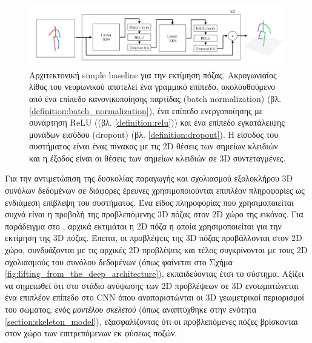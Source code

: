 \begin{figure}[h]
    \centering
    \includegraphics[scale=0.5]{images/chapter2/3d_pose_estimation/simple_baseline_architecture.jpg}
    \caption[Αρχιτεκτονική simple baseline για την εκτίμηση πόζας]{Αρχιτεκτονική simple baseline για την εκτίμηση πόζας. Ακρογωνιαίος λίθος του νευρωνικού αποτελεί ένα γραμμικό επίπεδο, ακολουθούμενο από ένα επίπεδο κανονικοποίησης παρτίδας (batch normalization) (βλ. \ref{definition:batch_normalization}), ένα επίπεδο ενεργοποίησης με συνάρτηση ReLU ((βλ. \ref{definition:relu})) και ένα επίπεδο εγκατάλειψης μονάδων εισόδου (dropout) (βλ. \ref{definition:dropout}). Η είσοδος του συστήματος είναι ένας πίνακας με τις 2D θέσεις των σημείων κλειδιών και η έξοδος είναι οι θέσεις των σημείων κλειδιών σε 3D συντεταγμένες.}
    \label{fig:simple_baseline}
\end{figure}

Για την αντιμετώπιση της δυσκολίας παραγωγής και σχολιασμού εξολοκλήρου 3D συνόλων δεδομένων σε διάφορες έρευνες χρησιμοποιούνται επιπλέον πληροφορίες ως ενδιάμεση επίβλεψη του συστήματος. Ένα είδος πληροφορίας που χρησιμοποιείται συχνά είναι η προβολή της προβλεπόμενης 3D πόζας στον 2D χώρο της εικόνας. Για παράδειγμα στο \cite{lifting_from_the_deep}, αρχικά εκτιμάται η 2D πόζα η οποία χρησιμοποιείται για την εκτίμηση της 3D πόζας. Έπειτα, οι προβλέψεις της 3D πόζας προβάλλονται στον 2D χώρο, συνδυάζονται με τις αρχικές 2D προβλέψεις και τέλος συγκρίνονται με τους 2D σχολιασμούς του συνόλου δεδομένων (όπως φαίνεται στο Σχήμα \ref{fig:lifting_from_the_deep_architecture}), εκπαιδεύοντας έτσι το σύστημα. Αξίζει να σημειωθεί ότι στο στάδιο ανύψωσης των 2D προβλέψεων σε 3D ενσωματώνεται ένα επιπλέον επίπεδο στο CNN όπου αναπαριστώνται οι 3D γεωμετρικοί περιορισμοί του σώματος, ενός \textsl{μοντέλου σκελετού} (όπως αναπτύχθηκε στην ενότητα \ref{section:skeleton_model}), εξασφαλίζοντας ότι οι προβλεπόμενες πόζες βρίσκονται στον χώρο των επιτρεπόμενων εκ φύσεως ποζών. 

